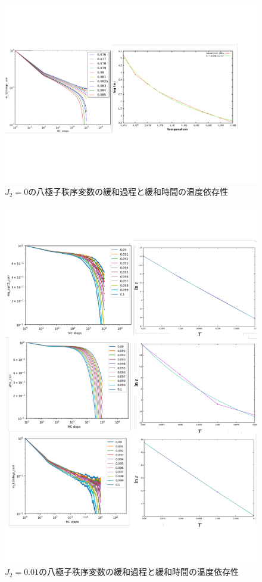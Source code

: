 \documentclass[12pt,titlepage,dvipdfmx]{jarticle}
\begin{document}
\begin{figure}[tbh]
   \centering
   \includegraphics[width=15cm]{figure/relaxation_process_J2_0.pdf}
   \caption{$J_2=0$の八極子秩序変数の緩和過程と緩和時間の温度依存性}
\end{figure}


\begin{figure}[tbh]
   \centering
   \includegraphics[width=15cm]{figure/relaxation_process_J2_0.01_2.pdf}
   \caption{$J_2=0.01$の八極子秩序変数の緩和過程と緩和時間の温度依存性}
\end{figure}
\end{document}
